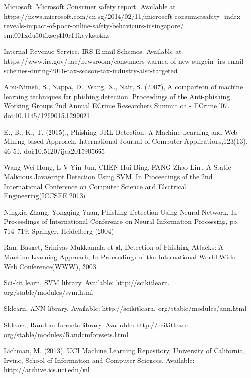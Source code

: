 \documentclass[conference]{IEEEtran}
\begin{document}
\begin{thebibliography}{1}

 Microsoft, Microsoft Consumer safety report. Available at
https://news.microsoft.com/en-sg/2014/02/11/microsoft-consumersafety-
index-reveals-impact-of-poor-online-safety-behaviours-insingapore/
sm.001xdu50tlxsej410r11kqvksu4nz

 Internal Revenue Service, IRS E-mail Schemes. Available at
https://www.irs.gov/uac/newsroom/consumers-warned-of-new-surgein-
irs-email-schemes-during-2016-tax-season-tax-industry-also-targeted

 Abu-Nimeh, S., Nappa, D., Wang, X., Nair, S. (2007), A comparison of
machine learning techniques for phishing detection. Proceedings of the
Anti-phishing Working Groups 2nd Annual ECrime Researchers Summit
on - ECrime ’07. doi:10.1145/1299015.1299021

 E., B., K., T. (2015)., Phishing URL Detection: A Machine Learning
and Web Mining-based Approach. International Journal of Computer
Applications,123(13), 46-50. doi:10.5120/ijca2015905665

 Wang Wei-Hong, L V Yin-Jun, CHEN Hui-Bing, FANG Zhao-Lin., A
Static Malicious Javascript Detection Using SVM, In Proceedings of
the 2nd International Conference on Computer Science and Electrical
Engineering(ICCSEE 2013)

 Ningxia Zhang, Yongqing Yuan, Phishing Detection Using Neural Network,
In Proceedings of International Conference on Neural Information
Processing, pp. 714–719. Springer, Heidelberg (2004)

 Ram Basnet, Srinivas Mukkamala et al, Detection of Phishing Attacks: A
Machine Learning Approach, In Proceedings of the International World
Wide Web Conference(WWW), 2003

 Sci-kit learn, SVM library. Available: http://scikitlearn.
org/stable/modules/svm.html

 Sklearn, ANN library. Available: http://scikitlearn.
org/stable/modules/ann.html

 Sklearn, Random foresets library. Available: http://scikitlearn.
org/stable/modules/Randomforesets.html

 Lichman, M. (2013). UCI Machine Learning Repository, University
of California, Irvine, School of Information and Computer Sciences.
Available: http://archive.ics.uci.edu/ml

\end{thebibliography}




\end{document}
